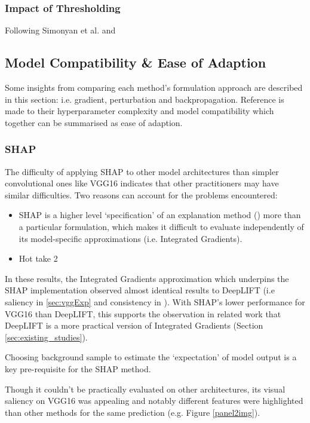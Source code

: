\documentclass[main]{subfiles}
\begin{document}
\subsubsection{Impact of Thresholding}
Following Simonyan et al. and 

\newpage
\subsection{Model Compatibility \& Ease of Adaption} \label{sec:compatibility}
Some insights from comparing each method's formulation approach are described in this section: i.e. gradient, perturbation and backpropagation. Reference is made to their hyperparameter complexity and model compatibility which together can be summarised as ease of adaption.
\subsubsection{SHAP}
The difficulty of applying SHAP to other model architectures than simpler convolutional ones like VGG16 indicates that other practitioners may have similar difficulties. Two reasons can account for the problems encountered:

\begin{itemize}
\item SHAP is a higher level `specification' of an explanation method (\label{sec:othermodelag}) more than a particular formulation, which makes it difficult to evaluate independently of its model-specific approximations (i.e. Integrated Gradients). 
\item Hot take 2
\end{itemize}

In these results, the Integrated Gradients approximation which underpins the SHAP implementation observed almost identical results to DeepLIFT (i.e saliency in \ref{sec:vggExp} and consistency in ). With SHAP's lower performance for VGG16 than DeepLIFT, this supports the observation in related work that DeepLIFT is a more practical version of Integrated Gradients (Section \ref{sec:existing_studies}).

Choosing background sample to estimate the `expectation' of model output is a key pre-requisite for the SHAP method.


Though it couldn't be practically evaluated on other architectures, its visual saliency on VGG16 was appealing and notably different features were highlighted than other methods for the same prediction (e.g. Figure \ref{panel2img}).
\end{document}
